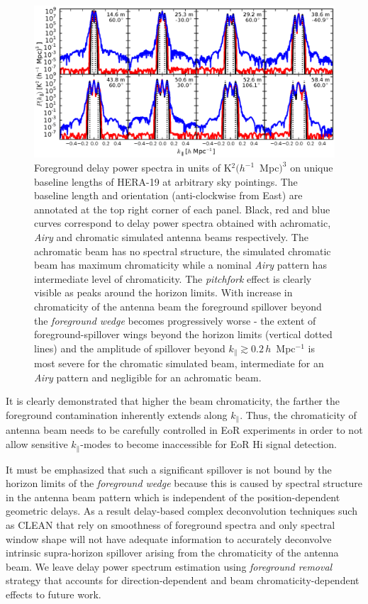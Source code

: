 \documentclass[preprint2,iop,numberedappendix,twocolappendix,appendixfloats]{emulateapj}
\begin{document}
\begin{figure}[htb]
  \centering
  \includegraphics[width=\linewidth]{asm_foreground_eor_beam_chromaticity_fullband_bhw2.0.eps}
  \caption{Foreground delay power spectra in units of K$^2 (h^{-1}$~Mpc$)^3$ on unique baseline lengths of HERA-19 at arbitrary sky pointings. The baseline length and orientation (anti-clockwise from East) are annotated at the top right corner of each panel. Black, red and blue curves correspond to delay power spectra obtained with achromatic, {\it Airy} and chromatic simulated antenna beams respectively. The achromatic beam has no spectral structure, the simulated chromatic beam has maximum chromaticity while a nominal {\it Airy} pattern has intermediate level of chromaticity. The {\it pitchfork} effect is clearly visible as peaks around the horizon limits. With increase in chromaticity of the antenna beam the foreground spillover beyond the {\it foreground wedge} becomes progressively worse - the extent of foreground-spillover wings beyond the horizon limits (vertical dotted lines) and the amplitude of spillover beyond $k_\parallel\gtrsim 0.2\,h$~Mpc$^{-1}$ is most severe for the chromatic simulated beam, intermediate for an {\it Airy} pattern and negligible for an achromatic beam.}
  \label{fig:asm-dps-beam-chromaticity-baselines}
\end{figure}

It is clearly demonstrated that higher the beam chromaticity, the farther the foreground contamination inherently extends along $k_\parallel$. Thus, the chromaticity of antenna beam needs to be carefully controlled in EoR experiments in order to not allow sensitive $k_\parallel$-modes to become inaccessible for EoR H{\sc i} signal detection.

It must be emphasized that such a significant spillover is not bound by the horizon limits of the {\it foreground wedge} because this is caused by spectral structure in the antenna beam pattern which is independent of the position-dependent geometric delays. As a result delay-based complex deconvolution techniques such as CLEAN \citep{tay99,par09,par12b} that rely on smoothness of foreground spectra and only spectral window shape will not have adequate information to accurately deconvolve intrinsic supra-horizon spillover arising from the chromaticity of the antenna beam. We leave delay power spectrum estimation using {\it foreground removal} strategy that accounts for direction-dependent and beam chromaticity-dependent effects to future work.
\end{document}
